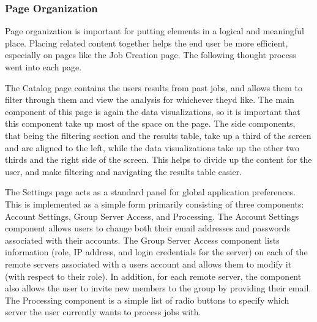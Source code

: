 \subsubsection{Page Organization}
Page organization is important for putting elements in a logical and meaningful place. Placing related content together helps the end user be more efficient, especially on pages like the Job Creation page. The following thought process went into each page.\par
The Catalog page contains the user\textquotesingle s results from past jobs, and allows them to filter through them and view the analysis for whichever they\textquotesingle d like. The main component of this page is again the data visualizations, so it is important that this component take up most of the space on the page. The side components, that being the filtering section and the results table, take up a third of the screen and are aligned to the left, while the data visualizations take up the other two thirds and the right side of the screen. This helps to divide up the content for the user, and make filtering and navigating the results table easier.\par
The Settings page acts as a standard panel for global application preferences. This is implemented as a simple form primarily consisting of three components: Account Settings, Group Server Access, and Processing. The Account Settings component allows users to change both their email addresses and passwords associated with their accounts. The Group Server Access component lists information (role, IP address, and login credentials for the server) on each of the remote servers associated with a user\textquotesingle s account and allows them to modify it (with respect to their role). In addition, for each remote server, the component also allows the user to invite new members to the group by providing their email. The Processing component is a simple list of radio buttons to specify which server the user currently wants to process jobs with.\par

